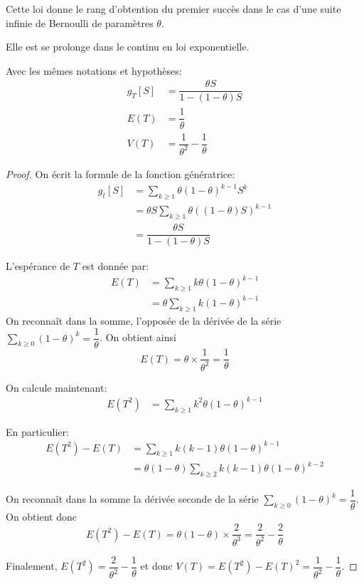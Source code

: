 \begin{cerveau}
Cette loi donne le rang d'obtention du premier succès dans le cas d'une suite infinie de Bernoulli de paramètres $\theta$.

Elle est se prolonge dans le continu en loi exponentielle.
\end{cerveau}

\begin{prop}
Avec les mêmes notations et hypothèses:
\begin{align*}
g_T[S] & = \dfrac{\theta S}{1-(1-\theta)S}\\
E(T) & = \dfrac{1}{\theta} \\
V(T) & = \dfrac{1}{\theta^2}-\dfrac{1}{\theta}
\end{align*}
\end{prop}


\begin{proof}
On écrit la formule de la fonction génératrice:
\begin{align*}
g_t[S] & = \displaystyle{\sum \limits_{k \geq 1}} \theta (1-\theta)^{k-1} S^k \\
 & = \theta S \displaystyle{\sum \limits_{k \geq 1}} \theta \left((1-\theta)S\right)^{k-1} \\
 & = \dfrac{\theta S}{1-(1-\theta)S}
\end{align*}


L'espérance de $T$ est donnée par:
\begin{align*}
E(T) & = \displaystyle{\sum \limits_{k \geq 1}}  k \theta (1-\theta)^{k-1} \\
 &  = \theta \displaystyle{\sum \limits_{k \geq 1}}  k (1-\theta)^{k-1}
\end{align*}
On reconnaît dans la somme, l'opposée de la dérivée de la série $\displaystyle{\sum \limits_{k \geq 0}}  (1-\theta)^k = \dfrac{1}{\theta}$. On obtient ainsi
\[
E(T) = \theta \times \dfrac{1}{\theta^2} = \dfrac{1}{\theta}
\]

On calcule maintenant:
\begin{align*}
E(T^2) & = \displaystyle{\sum \limits_{k \geq 1}}  k^2 \theta (1-\theta)^{k-1}
\end{align*}

En particulier:
\begin{align*}
E(T^2)-E(T) & = \displaystyle{\sum \limits_{k \geq 1}}  k(k-1) \theta (1-\theta)^{k-1} \\
 & = \theta (1-\theta) \displaystyle{\sum \limits_{k \geq 2}}  k(k-1) \theta (1-\theta)^{k-2}
\end{align*}

On reconnaît dans la somme la dérivée seconde de la série $\displaystyle{\sum \limits_{k \geq 0}}  (1-\theta)^k = \dfrac{1}{\theta}$. On obtient donc
\[
E(T^2)-E(T) = \theta (1-\theta) \times \dfrac{2}{\theta^3} = \dfrac{2}{\theta^2}-\dfrac{2}{\theta}
\]

Finalement, $E(T^2) = \dfrac{2}{\theta^2}-\dfrac{1}{\theta}$ et donc $V(T)=E(T^2)-E(T)^2 = \dfrac{1}{\theta^2}-\dfrac{1}{\theta}$.
\end{proof}

